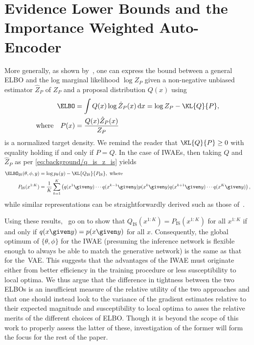 
\section{Evidence Lower Bounds and the Importance Weighted Auto-Encoder}

More generally, as shown by~\cite{maddison2017filtering,anonymous2018auto-encoding}, one can express the bound
between a general \gls{ELBO} and the log marginal likelihood $\log Z_P$ given a non-negative unbiased estimator $\hat{Z}_P$
of $Z_P$ and a proposal distribution $Q(x)$ using
\begin{align}
\ELBO &= \int Q(x) \log \hat Z_P(x) \,\mathrm dx = \log Z_P - \KL{Q}{P},
\label{eqn:aesmc/bias/elbo3} \\
\text{where} \quad P(x) &= \frac{Q(x) \hat Z_P(x)}{Z_P} \label{eqn:aesmc/bias/P}
\end{align}
is a normalized target density.  We remind the reader that $\KL{Q}{P}\ge0$ with equality holding if and only if
$P=Q$.
In the case of \glspl{IWAE}, then taking $Q$ and $\hat Z_P$ as per \eqref{eq:background/q_is_z_is} yields
\begin{align}
\ELBO_{\text{IS}}(\theta, \phi, y) &= \log p_{\theta}(y) - \KL{Q_{\text{IS}}}{P_{\text{IS}}}, \text{ where } \label{eqn:aesmc/bias/elbo_is} \\
P_{\text{IS}}(x^{1:K}) &= \frac{1}{K} \sum_{k = 1}^K \left(q(x^1 \given y) \cdots q(x^{k - 1} \given y) p(x^k \given y) q(x^{k + 1} \given y) \cdots q(x^K \given y) \right),
\end{align}
while similar representations can be straightforwardly derived such as those of~\cite{le2017auto,maddison2017filtering,naesseth2017variational}.

Using these results,~\cite{anonymous2018auto-encoding} go on to show that
$Q_{\text{IS}}(x^{1:K}) = P_{\text{IS}}(x^{1:K})$ for all $x^{1:K}$ if and only if $q(x \given y) = p(x \given y)$ for all $x$.
Consequently, the global optimum of $\{\theta,\phi\}$ for the \gls{IWAE} (presuming the inference network is flexible enough to always be able to
match the generative network) is the same as that for the~\gls{VAE}.  This
suggests that the advantages of the \gls{IWAE} must
originate either from better efficiency in the training procedure or less susceptibility 
to local optima. We thus
argue that the difference in tightness between the two \glspl{ELBO} is an insufficient measure of the relative utility of the two
approaches and that one should instead look to the variance of the gradient estimates relative to their expected magnitude and
susceptibility to local optima to asses the relative merits of the different choices of \gls{ELBO}.  Though it is beyond the
scope of this work to properly assess the latter of these, investigation of the former will form the focus for the rest of the paper.